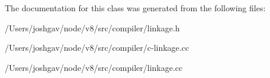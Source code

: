 The documentation for this class was generated from the following files\+:\begin{DoxyCompactItemize}
\item 
/\+Users/joshgav/node/v8/src/compiler/linkage.\+h\item 
/\+Users/joshgav/node/v8/src/compiler/c-\/linkage.\+cc\item 
/\+Users/joshgav/node/v8/src/compiler/linkage.\+cc\end{DoxyCompactItemize}
